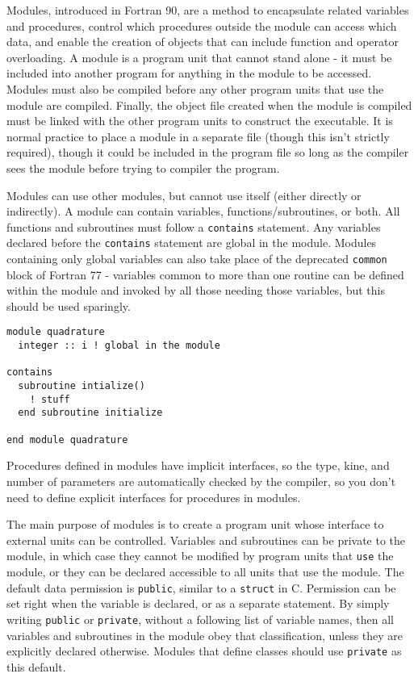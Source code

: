 \documentclass[10pt]{article}
\begin{document}
Modules, introduced in Fortran 90, are a method to encapsulate related variables and procedures, control which procedures outside the module can access which data, and enable the creation of objects that can include function and operator overloading. A module is a program unit that cannot stand alone - it must be included into another program for anything in the module to be accessed. Modules must also be compiled before any other program units that use the module are compiled. Finally, the object file created when the module is compiled must be linked with the other program units to construct the executable. It is normal practice to place a module in a separate file (though this isn't strictly required), though it could be included in the program file so long as the compiler sees the module before trying to compiler the program. 

Modules can use other modules, but cannot use itself (either directly or indirectly). A module can contain variables, functions/subroutines, or both. All functions and subroutines must follow a {\tt contains} statement. Any variables declared before the {\tt contains} statement are global in the module. Modules containing only global variables can also take place of the deprecated {\tt common} block of Fortran 77 - variables common to more than one routine can be defined within the module and invoked by all those needing those variables, but this should be used sparingly. 

\begin{lstlisting}
module quadrature
  integer :: i ! global in the module
  
contains
  subroutine intialize()
    ! stuff
  end subroutine initialize
  
end module quadrature
\end{lstlisting}

Procedures defined in modules have implicit interfaces, so the type, kine, and number of parameters are automatically checked by the compiler, so you don't need to define explicit interfaces for procedures in modules. 

The main purpose of modules is to create a program unit whose interface to external units can be controlled. Variables and subroutines can be private to the module, in which case they cannot be modified by program units that {\tt use} the module, or they can be declared accessible to all units that use the module. The default data permission is {\tt public}, similar to a {\tt struct} in C. Permission can be set right when the variable is declared, or as a separate statement. By simply writing {\tt public} or {\tt private}, without a following list of variable names, then all variables and subroutines in the module obey that classification, unless they are explicitly declared otherwise. Modules that define classes should use {\tt private} as this default.
\end{document}
